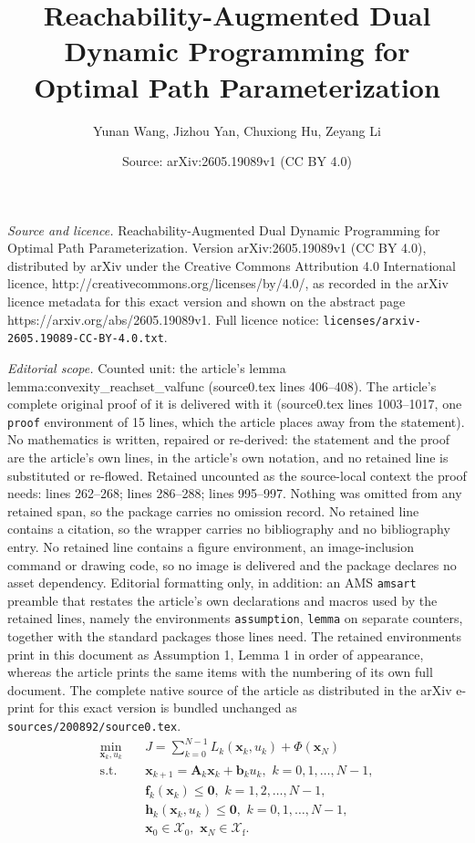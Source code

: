\documentclass[10pt,a4paper]{amsart}
\title{Reachability-Augmented Dual Dynamic Programming for Optimal Path Parameterization}
\author{Yunan Wang, Jizhou Yan, Chuxiong Hu, Zeyang Li}
\date{Source: arXiv:2605.19089v1 (CC BY 4.0)}
\newcommand\st{{\text{s.t.}}}
\newcommand\vA{{\vector{A}}}
\newcommand\vb{{\vector{b}}}
\renewcommand\vector[1]{\boldsymbol{#1}}
\newcommand\vf{{\vector{f}}}
\newcommand\vh{{\vector{h}}}
\newcommand\vx{{\vector{x}}}
\newcommand\vzero{{\vector{0}}}
\begin{document}
\maketitle

\noindent\emph{Source and licence.} Reachability-Augmented Dual Dynamic Programming for Optimal Path Parameterization. Version arXiv:2605.19089v1 (CC BY 4.0), distributed by arXiv under the Creative Commons Attribution 4.0 International licence, http://creativecommons.org/licenses/by/4.0/, as recorded in the arXiv licence metadata for this exact version and shown on the abstract page https://arxiv.org/abs/2605.19089v1. Full licence notice: \texttt{licenses/arxiv-2605.19089-CC-BY-4.0.txt}.\par\smallskip

\noindent\textit{Editorial scope.} Counted unit: the article's lemma lemma:convexity\_reachset\_valfunc (source0.tex lines 406--408). The article's complete original proof of it is delivered with it (source0.tex lines 1003--1017, one \texttt{proof} environment of 15 lines, which the article places away from the statement). No mathematics is written, repaired or re-derived: the statement and the proof are the article's own lines, in the article's own notation, and no retained line is substituted or re-flowed.  Retained uncounted as the source-local context the proof needs: lines 262--268; lines 286--288; lines 995--997.  Nothing was omitted from any retained span, so the package carries no omission record.  No retained line contains a citation, so the wrapper carries no bibliography and no bibliography entry.  No retained line contains a figure environment, an image-inclusion command or drawing code, so no image is delivered and the package declares no asset dependency.  Editorial formatting only, in addition: an AMS \texttt{amsart} preamble that restates the article's own declarations and macros used by the retained lines, namely the environments \texttt{assumption}, \texttt{lemma} on separate counters, together with the standard packages those lines need.  The retained environments print in this document as Assumption 1, Lemma 1 in order of appearance, whereas the article prints the same items with the numbering of its own full document.  The complete native source of the article as distributed in the arXiv e-print for this exact version is bundled unchanged as \texttt{sources/200892/source0.tex}.
    \begin{align}
        \min_{\vx_k,u_k} \quad &J = \sum_{k=0}^{N-1} L_k(\vx_k, u_k) + \Phi(\vx_N) \label{eq:op_discretize_objective}\\
        \st \quad & \vx_{k+1} = \vA_k\vx_k + \vb_k u_k, \,\,k=0,1,\ldots,N-1,\label{eq:op_discretize_dynamics} \\
        &\vf_k(\vx_k) \leq \vzero,  \,\,k=1,2,\ldots,N-1, \label{eq:op_discretize_state_constraints}\\
        &\vh_k(\vx_k, u_k) \leq \vzero, \,\,k=0,1,\ldots,N-1,\label{eq:op_discretize_mix_constraints}\\
        &\vx_0\in\mathcal{X}_0, \,\,\vx_N\in\mathcal{X}_\text{f}.
    \end{align}
\end{document}

